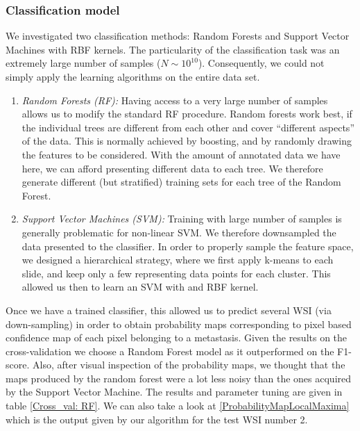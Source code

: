 \documentclass[a4paper,10pt]{article}
\begin{document}
%
%
\subsubsection{Classification model}
We investigated two classification methods: Random Forests and Support
Vector Machines with RBF kernels. The particularity of the
classification task was an extremely large number of samples ($N \sim  10^{10}$).
Consequently, we could not simply apply the learning algorithms on the
entire data set.  
\begin{enumerate}
\item {\it Random Forests (RF):} Having access to a very large number of
  samples allows us to modify the standard RF procedure. Random
  forests work best, if the individual trees are different from each
  other and cover ``different aspects'' of the data. This is normally
  achieved by boosting, and by randomly drawing the features to be
  considered. With the amount of annotated data we have here, we can
  afford presenting different data to each tree. We therefore generate
  different (but stratified) training sets for each tree of the Random
  Forest.  
\item {\it Support Vector Machines (SVM):} Training with large number
  of samples is generally problematic for non-linear SVM. We therefore
  downsampled the data presented to the classifier. In order to
  properly sample the feature space, we designed a hierarchical
  strategy, where we first apply k-means to each slide, and keep only
  a few representing data points for each cluster. This allowed us
  then to learn an SVM with and RBF kernel. 
\end{enumerate}

Once we have a trained classifier, this allowed us to predict several WSI (via down-sampling) in order to obtain probability maps corresponding to pixel based confidence map of each pixel belonging to a metastasis. Given the results on the cross-validation we choose a Random Forest model as it outperformed on the F1-score. Also, after visual inspection of the probability maps, we thought that the maps produced by the random forest were a lot less noisy than the ones acquired by the Support Vector Machine. The results and parameter tuning are given in table \ref{Cross_val: RF}. We can also take a look at \ref{ProbabilityMapLocalMaxima} which is the output given by our algorithm for the test WSI number 2.
\end{document}
